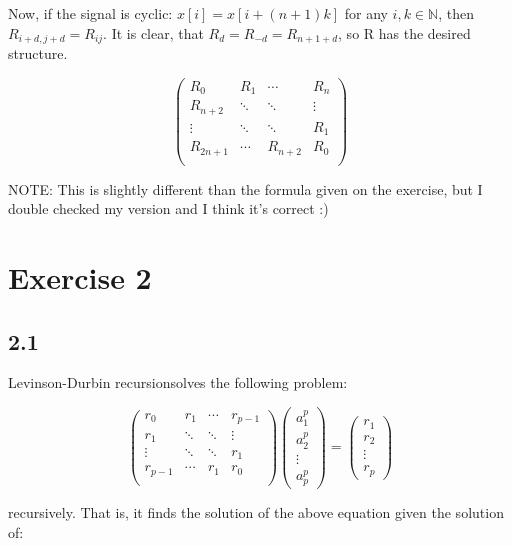 \documentclass[a4paper]{article}
\def\N{\mathbb{N}}
\def\LDR{Levinson-Durbin recursion\;}
\begin{document}
Now, if the signal is cyclic: $ x[i] = x[i+(n+1)k] $ for any $ i, k \in \N $,
then $ R_{i+d,j+d} = R_{ij} $. It is clear, that $ R_{d} = R_{-d} = R_{n+1+d} $,
so R has the desired structure.

\[
\begin{pmatrix}
  R_{0} & R_{1} & \cdots & R_{n} \\
  R_{n+2} & \ddots & \ddots & \vdots \\
  \vdots & \ddots & \ddots & R_{1} \\
  R_{2n+1} & \cdots & R_{n+2} & R_{0} \\
\end{pmatrix}
\]

NOTE: This is slightly different than the formula given on the exercise, but I double checked my version and I think it's correct :)

\section*{Exercise 2}

\subsection*{2.1}

\LDR solves the following problem:

\[
\begin{pmatrix}
  r_{0} & r_{1} & \cdots & r_{p-1} \\
  r_{1} & \ddots & \ddots & \vdots \\
  \vdots & \ddots & \ddots & r_{1} \\
  r_{p-1} & \cdots & r_{1} & r_{0} \\
\end{pmatrix} \begin{pmatrix}
  a_1^p \\ a_2^p \\ \vdots \\ a_p^p
\end{pmatrix} = \begin{pmatrix}
  r_1 \\ r_2 \\ \vdots \\ r_p
\end{pmatrix}
\]

recursively. That is, it finds the solution of the above equation given the
solution of:
\end{document}
